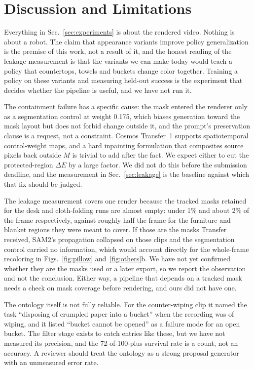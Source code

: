 \section{Discussion and Limitations}
\label{sec:limits}

Everything in Sec.~\ref{sec:experiments} is about the rendered video. Nothing is about a robot. The claim that appearance variants improve policy generalization is the premise of this work, not a result of it, and the honest reading of the leakage measurement is that the variants we can make today would teach a policy that countertops, towels and buckets change color together. Training a policy on these variants and measuring held-out success is the experiment that decides whether the pipeline is useful, and we have not run it.

The containment failure has a specific cause: the mask entered the renderer only as a segmentation control at weight 0.175, which biases generation toward the mask layout but does not forbid change outside it, and the prompt's preservation clause is a request, not a constraint. Cosmos Transfer~1 supports spatiotemporal control-weight maps, and a hard inpainting formulation that composites source pixels back outside $M$ is trivial to add after the fact. We expect either to cut the protected-region $\Delta E$ by a large factor. We did not do this before the submission deadline, and the measurement in Sec.~\ref{sec:leakage} is the baseline against which that fix should be judged.

The leakage measurement covers one render because the tracked masks retained for the desk and cloth-folding runs are almost empty: under 1\% and about 2\% of the frame respectively, against roughly half the frame for the furniture and blanket regions they were meant to cover. If those are the masks Transfer received, SAM2's propagation collapsed on those clips and the segmentation control carried no information, which would account directly for the whole-frame recoloring in Figs.~\ref{fig:pillow} and~\ref{fig:others}b. We have not yet confirmed whether they are the masks used or a later export, so we report the observation and not the conclusion. Either way, a pipeline that depends on a tracked mask needs a check on mask coverage before rendering, and ours did not have one.

The ontology itself is not fully reliable. For the counter-wiping clip it named the task ``disposing of crumpled paper into a bucket'' when the recording was of wiping, and it listed ``bucket cannot be opened'' as a failure mode for an open bucket. The filter stage exists to catch entries like these, but we have not measured its precision, and the 72-of-100-plus survival rate is a count, not an accuracy. A reviewer should treat the ontology as a strong proposal generator with an unmeasured error rate.

